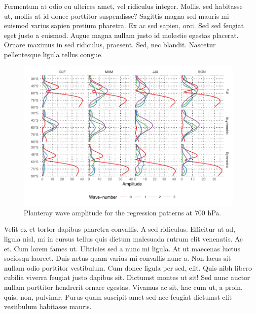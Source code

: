 \documentclass[twocol]{ametsocV5}
\begin{document}
Fermentum at odio eu ultrices amet, vel ridiculus integer. Mollis, sed
habitasse ut, mollis at id donec porttitor suspendisse? Sagittis magna
sed mauris mi euismod varius sapien pretium pharetra. Ex ac sed sapien,
orci. Sed sed feugiat eget justo a euismod. Augue magna nullam justo id
molestie egestas placerat. Ornare maximus in sed ridiculus, praesent.
Sed, nec blandit. Nascetur pellentesque ligula tellus congue.

\begin{figure}
\includegraphics{wave-amplitude-700-1} \caption[Planteray wave amplitude for the regression patterns at 700 hPa]{Planteray wave amplitude for the regression patterns at 700 hPa.}\label{fig:wave-amplitude-700}
\end{figure}

Velit ex et tortor dapibus pharetra convallis. A sed ridiculus.
Efficitur ut ad, ligula nisl, mi in cursus tellus quis dictum malesuada
rutrum elit venenatis. Ac et. Cum lorem fames ut. Ultricies sed a nunc
mi ligula. At ut maecenas luctus sociosqu laoreet. Duis netus quam
varius mi convallis nunc a. Non lacus sit nullam odio porttitor
vestibulum. Cum donec ligula per sed, elit. Quis nibh libero cubilia
viverra feugiat justo dapibus sit. Dictumst montes ut sit! Sed nunc
auctor nullam porttitor hendrerit ornare egestas. Vivamus ac sit, hac
cum ut, a proin, quis, non, pulvinar. Purus quam suscipit amet sed nec
feugiat dictumst elit vestibulum habitasse mauris.
\end{document}
